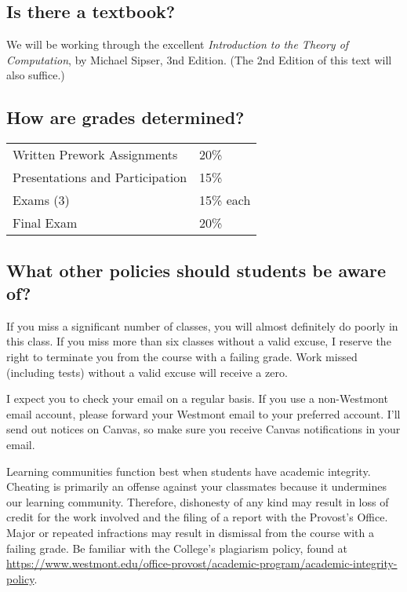 \documentclass[
  twoside]{article}
\begin{document}
\hypertarget{is-there-a-textbook}{%
\subsection{Is there a textbook?}\label{is-there-a-textbook}}

We will be working through the excellent \emph{Introduction to the
Theory of Computation}, by Michael Sipser, 3nd Edition. (The 2nd Edition
of this text will also suffice.)

\hypertarget{how-are-grades-determined}{%
\subsection{How are grades
determined?}\label{how-are-grades-determined}}

\begin{tabular}[t]{ll}
\toprule
Written Prework Assignments & 20\%\\
Presentations and Participation & 15\%\\
Exams (3) & 15\% each\\
Final Exam & 20\%\\
\bottomrule
\end{tabular}

\hypertarget{what-other-policies-should-students-be-aware-of}{%
\subsection{What other policies should students be aware
of?}\label{what-other-policies-should-students-be-aware-of}}

If you miss a significant number of classes, you will almost definitely
do poorly in this class. If you miss more than six classes without a
valid excuse, I reserve the right to terminate you from the course with
a failing grade. Work missed (including tests) without a valid excuse
will receive a zero.

I expect you to check your email on a regular basis. If you use a
non-Westmont email account, please forward your Westmont email to your
preferred account. I'll send out notices on Canvas, so make sure you
receive Canvas notifications in your email.

Learning communities function best when students have academic
integrity. Cheating is primarily an offense against your classmates
because it undermines our learning community. Therefore, dishonesty of
any kind may result in loss of credit for the work involved and the
filing of a report with the Provost's Office. Major or repeated
infractions may result in dismissal from the course with a failing
grade. Be familiar with the College's plagiarism policy, found at
\url{https://www.westmont.edu/office-provost/academic-program/academic-integrity-policy}.
\end{document}

